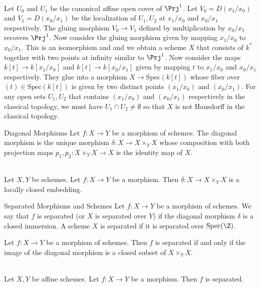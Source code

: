 \documentclass[a4paper]{article}
\begin{document}
\begin{eg}{}{}\\
Let $U_0$ and $U_1$ be the canonical affine open cover of $\Prj^1$. Let $V_0=D(x_1/x_0)$ and $V_1=D(x_0/x_1)$ be the localization of $U_1,U_2$ at $x_1/x_0$ and $x_0/x_1$ respectively. The gluing morphism $V_0\to V_1$ defined by multiplication by $x_0/x_1$ recovers $\Prj^1$. Now consider the gluing morphism given by mapping $x_1/x_0$ to $x_0/x_1$. This is an isomorphism and and we obtain a scheme $X$ that consists of $k^\ast$ together with two points at infinity similar to $\Prj^1$. Now consider the maps $k[t]\to k[x_1/x_0]$ and $k[t]\to k[x_0/x_1]$ given by mapping $t$ to $x_1/x_0$ and $x_0/x_1$ respectively. They glue into a morphism $X\to\text{Spec}(k[t])$ whose fiber over $(t)\in\text{Spec}(k[t])$ is given by two distinct points $(x_1/x_0)$ and $(x_0/x_1)$. For any open sets $U_1,U_2$ that contains $(x_1/x_0)$ and $(x_0/x_1)$ respectively in the classical topology, we must have $U_1\cap U_2\neq\emptyset$ so that $X$ is not Hausdorff in the classical topology. 
\end{eg}

\begin{defn}{Diagonal Morphisms}{} Let $f:X\to Y$ be a morphism of schemes. The diagonal morphism is the unique morphism $\delta:X\to X\times_Y X$ whose composition with both projection maps $p_1,p_2:X\times_Y X\to X$ is the identity map of $X$. 
\end{defn}

\begin{lmm}{}{}\\
Let $X,Y$ be schemes. Let $f:X\to Y$ be a morphism. Then $\delta:X\to X\times_YX$ is a locally closed embedding. 
\end{lmm}

\begin{defn}{Separated Morphisms and Schemes}{} Let $f:X\to Y$ be a morphism of schemes. We say that $f$ is separated (or $X$ is separated over $Y$) if the diagonal morphism $\delta$ is a closed immersion. A scheme $X$ is separated if it is separated over $\text{Spec}(\Z)$. 
\end{defn}

\begin{prp}{}{} Let $f:X\to Y$ be a morphism of schemes. Then $f$ is separated if and only if the image of the diagonal morphism is a closed subset of $X\times_Y X$. 
\end{prp}

\begin{prp}{}{}\\
Let $X,Y$ be affine schemes. Let $f:X\to Y$ be a morphism. Then $f$ is separated. 
\end{prp}
\end{document}
